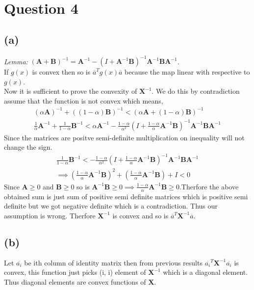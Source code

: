 \documentclass{article}
\begin{document}
\section*{\hfil Question 4}
\subsection*{(a)}
\textit{Lemma:} $(\mathbf{A} + \mathbf{B})^{-1} = \mathbf{A}^{-1} - (I + \mathbf{A}^{-1}\mathbf{B})^{-1}\mathbf{A}^{-1}\mathbf{B}\mathbf{A}^{-1}$.\\
If $g(x)$ is convex then so is $\overline{a}^Tg(x)\overline{a}$ because the map linear with respective to $g(x)$.\\
Now it is sufficient to prove the convexity of $\mathbf{X}^{-1}$. We do this by contradiction assume that the function is not convex which means,
\begin{gather*}
	(\alpha \mathbf{A})^{-1} + ((1-\alpha)\mathbf{B})^{-1} < \left(\alpha \mathbf{A} + (1-\alpha)\mathbf{B}\right)^{-1}\\
	\frac{1}{\alpha} \mathbf{A}^{-1} + \frac{1}{1-\alpha}\mathbf{B}^{-1} < \alpha \mathbf{A}^{-1} - \frac{1-\alpha}{\alpha ^2}(I + \frac{1-\alpha}{\alpha}\mathbf{A}^{-1}\mathbf{B})^{-1}\mathbf{A}^{-1}\mathbf{BA}^{-1}
\end{gather*}
Since the matrices are positve semi-definite multiplication on inequality will not change the sign.
\begin{gather*}
	\frac{1}{1-\alpha}\mathbf{B}^{-1} <  - \frac{1-\alpha}{\alpha ^2}(I + \frac{1-\alpha}{\alpha}\mathbf{A}^{-1}\mathbf{B})^{-1}\mathbf{A}^{-1}\mathbf{BA}^{-1}\\
	\implies \left(\frac{1-\alpha}{\alpha}\mathbf{A}^{-1}\mathbf{B}\right)^2 + \left(\frac{1-\alpha}{\alpha}\mathbf{A}^{-1}\mathbf{B}\right) + I < 0
\end{gather*}
Since $\mathbf{A} \ge 0$ and $\mathbf{B} \ge 0$ so is $\mathbf{A}^{-1}\mathbf{B} \ge 0 \implies \frac{1-\alpha}{\alpha}\mathbf{A}^{-1}\mathbf{B} \ge 0$.Therfore the above obtained sum is just sum of positive semi definite matrices which is positive semi definite but we got negative definite which is a contradiction. Thus our assumption is wrong. Therfore $\mathbf{X}^{-1}$ is convex and so is $\overline{a}^T\mathbf{X}^{-1}\overline{a}$.
\subsection*{(b)}
Let $\overline{a_i}$ be ith column of identity matrix then from previous results $\overline{a_i}^T{\mathbf{X}^{-1}}\overline{a_i}$ is convex, this function just picks (i, i) element of ${\mathbf{X}^{-1}}$ which is a diagonal element. Thus diagonal elements are convex functions of $\mathbf{X}$.
\end{document}
